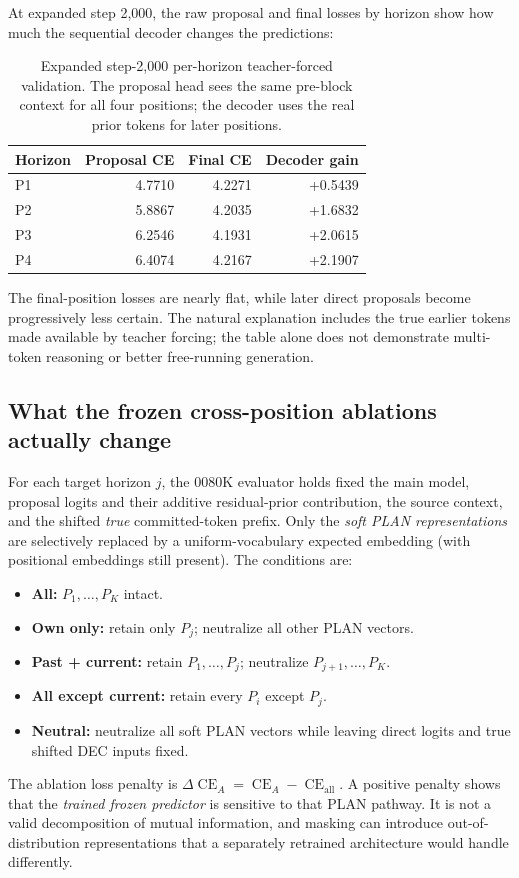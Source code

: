 \documentclass[11pt,letterpaper]{article}
\newcommand{\CE}{\operatorname{CE}}
\begin{document}
At expanded step 2,000, the raw proposal and final losses by horizon show how much the sequential decoder changes the predictions:
\begin{table}[ht]
\centering
\caption{Expanded step-2,000 per-horizon teacher-forced validation. The proposal head sees the same pre-block context for all four positions; the decoder uses the real prior tokens for later positions.}
\label{tab:horizon}
\begin{tabular}{@{}lrrr@{}}\toprule
Horizon & Proposal CE & Final CE & Decoder gain\\\midrule
P1 & 4.7710 & 4.2271 & +0.5439\\
P2 & 5.8867 & 4.2035 & +1.6832\\
P3 & 6.2546 & 4.1931 & +2.0615\\
P4 & 6.4074 & 4.2167 & +2.1907\\\bottomrule
\end{tabular}
\end{table}
The final-position losses are nearly flat, while later direct proposals become progressively less certain. The natural explanation includes the true earlier tokens made available by teacher forcing; the table alone does not demonstrate multi-token reasoning or better free-running generation.

\subsection{What the frozen cross-position ablations actually change}
For each target horizon $j$, the 0080K evaluator holds fixed the main model, proposal logits and their additive residual-prior contribution, the source context, and the shifted \emph{true} committed-token prefix. Only the \emph{soft PLAN representations} are selectively replaced by a uniform-vocabulary expected embedding (with positional embeddings still present). The conditions are:
\begin{itemize}
\item \textbf{All:} $P_1,\ldots,P_K$ intact.
\item \textbf{Own only:} retain only $P_j$; neutralize all other PLAN vectors.
\item \textbf{Past + current:} retain $P_1,\ldots,P_j$; neutralize $P_{j+1},\ldots,P_K$.
\item \textbf{All except current:} retain every $P_i$ except $P_j$.
\item \textbf{Neutral:} neutralize all soft PLAN vectors while leaving direct logits and true shifted DEC inputs fixed.
\end{itemize}
The ablation loss penalty is $\Delta\CE_A=\CE_A-\CE_{\mathrm{all}}$. A positive penalty shows that the \emph{trained frozen predictor} is sensitive to that PLAN pathway. It is not a valid decomposition of mutual information, and masking can introduce out-of-distribution representations that a separately retrained architecture would handle differently.
\end{document}
